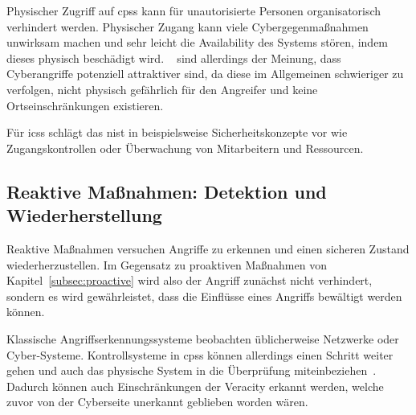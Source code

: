 \documentclass[final,bibliography=totocnumbered]{include/sikseminar}
\newcommand{\cps}{\glspl{cps}\xspace}
\begin{document}
    \label{physisch-orga}
    Physischer Zugriff auf \cps kann für unautorisierte Personen organisatorisch verhindert werden.
    Physischer Zugang kann viele Cybergegenmaßnahmen unwirksam machen und sehr leicht die Availability des Systems stören, indem dieses physisch beschädigt wird.
    \citeauthor{CAS08}~\cite{CAS08} sind allerdings der Meinung, dass Cyberangriffe potenziell attraktiver sind, da diese im Allgemeinen schwieriger zu verfolgen, nicht physisch gefährlich für den Angreifer und keine Ortseinschränkungen existieren.

    Für \glspl{ics} schlägt das \gls{nist} in \cite{SPL+15} beispielsweise Sicherheitskonzepte vor wie Zugangskontrollen oder Überwachung von Mitarbeitern und Ressourcen.


    \subsection{Reaktive Maßnahmen: Detektion und Wiederherstellung}\label{subsec:reactive}

    Reaktive Maßnahmen versuchen Angriffe zu erkennen und einen sicheren Zustand wiederherzustellen.
    Im Gegensatz zu proaktiven Maßnahmen von Kapitel~\ref{subsec:proactive} wird also der Angriff zunächst nicht verhindert, sondern es wird gewährleistet, dass die Einflüsse eines Angriffs bewältigt werden können.

    Klassische Angriffserkennungssysteme beobachten üblicherweise Netzwerke oder Cyber-Systeme.
    Kontrollsysteme in \cps können allerdings einen Schritt weiter gehen und auch das physische System in die Überprüfung miteinbeziehen~\cite{CAS+09}.
    Dadurch können auch Einschränkungen der Veracity erkannt werden, welche zuvor von der Cyberseite unerkannt geblieben worden wären.
\end{document}
